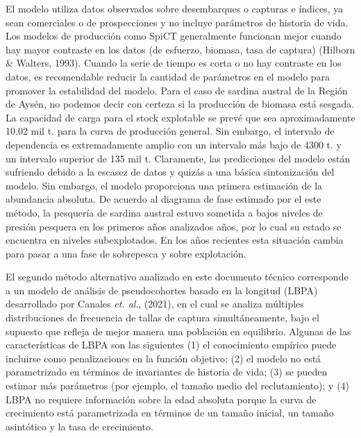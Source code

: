 \documentclass[
  spanish,
]{article}
\begin{document}
El modelo utiliza datos observados sobre desembarques o capturas e
índices, ya sean comerciales o de prospecciones y no incluye parámetros
de historia de vida. Los modelos de producción como SpiCT generalmente
funcionan mejor cuando hay mayor contraste en los datos (de esfuerzo,
biomasa, tasa de captura) (Hilborn \& Walters, 1993). Cuando la serie de
tiempo es corta o no hay contraste en los datos, es recomendable reducir
la cantidad de parámetros en el modelo para promover la estabilidad del
modelo. Para el caso de sardina austral de la Región de Aysén, no
podemos decir con certeza si la producción de biomasa está sesgada. La
capacidad de carga para el stock explotable se prevé que sea
aproximadamente 10.02 mil t. para la curva de producción general. Sin
embargo, el intervalo de dependencia es extremadamente amplio con un
intervalo más bajo de 4300 t. y un intervalo superior de 135 mil t.
Claramente, las predicciones del modelo están sufriendo debido a la
escasez de datos y quizás a una básica sintonización del modelo. Sin
embargo, el modelo proporciona una primera estimación de la abundancia
absoluta. De acuerdo al diagrama de fase estimado por el este método, la
pesquería de sardina austral estuvo sometida a bajos niveles de presión
pesquera en los primeros años analizados años, por lo cual su estado se
encuentra en niveles subexplotados. En los años recientes esta situación
cambia para pasar a una fase de sobrepesca y sobre explotación.

El segundo método alternativo analizado en este documento técnico
corresponde a un modelo de análisis de pseudocohortes basado en la
longitud (LBPA) desarrollado por Canales \emph{et. al}., (2021), en el
cual se analiza múltiples distribuciones de frecuencia de tallas de
captura simultáneamente, bajo el supuesto que refleja de mejor manera
una población en equilibrio. Algunas de las características de LBPA son
las siguientes (1) el conocimiento empírico puede incluirse como
penalizaciones en la función objetivo; (2) el modelo no está
parametrizado en términos de invariantes de historia de vida; (3) se
pueden estimar más parámetros (por ejemplo, el tamaño medio del
reclutamiento); y (4) LBPA no requiere información sobre la edad
absoluta porque la curva de crecimiento está parametrizada en términos
de un tamaño inicial, un tamaño asintótico y la tasa de crecimiento.
\end{document}
